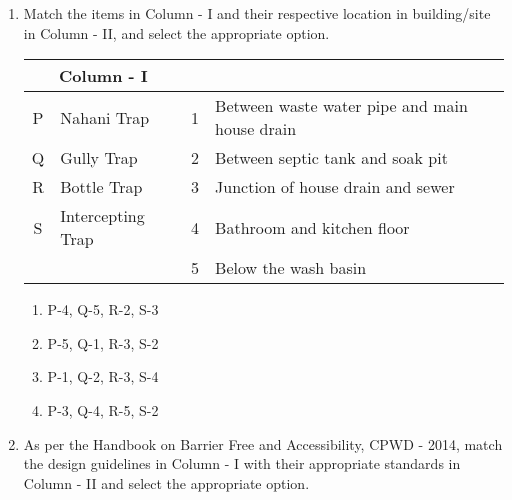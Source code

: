 \documentclass[12pt]{article}
\begin{document}
\begin{enumerate}[label=Q.\arabic*,start=26]
		\begin{multicols}{2}
			\begin{enumerate}
				\item P-4, Q-5, R-4, S-1
				\item P-1, Q-5, R-2, S-3
				\item P-5, Q-4, R-1, S-3
				\item P-4, Q-5, R-2, S-1
			\end{enumerate}
		\end{multicols}

	\item Match the items in Column - I and their respective location in building/site in Column - II, and select the appropriate option.

		\begin{center}
			\begin{tabular}{|c|>{\raggedright\arraybackslash}p{5.8cm}|c|>{\raggedright\arraybackslash}p{5.8cm}|}
				\hline
				\multicolumn{2}{|c|}{\textbf{Column - I}} & \multicolumn{2}{c|}{\textbf{Column - II}} \\
				\hline
				P & Nahani Trap & 1 & Between waste water pipe and main house drain \\
				\hline
				Q & Gully Trap & 2 & Between septic tank and soak pit \\
				\hline
				R & Bottle Trap & 3 & Junction of house drain and sewer \\
				\hline
				S & Intercepting Trap & 4 & Bathroom and kitchen floor \\
				\hline
				&  & 5 & Below the wash basin \\
				\hline
			\end{tabular}
		\end{center}

		\begin{multicols}{2}
			\begin{enumerate}
				\item P-4, Q-5, R-2, S-3
				\item P-5, Q-1, R-3, S-2
				\item P-1, Q-2, R-3, S-4
				\item P-3, Q-4, R-5, S-2
			\end{enumerate}
		\end{multicols}

	\item As per the Handbook on Barrier Free and Accessibility, CPWD - 2014, match the design guidelines in Column - I with their appropriate standards in Column - II and select the appropriate option.



\end{enumerate}
\end{document}
